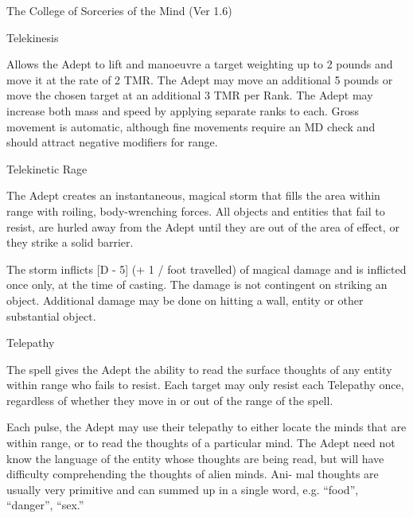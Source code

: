\begin{Chapter}{The College of Sorceries of the Mind (Ver 1.6)}
\begin{spell}[S-7]{Telekinesis }
\begin{effects}
Allows the Adept to lift and manoeuvre a target weighting up to 2
pounds and move it at the rate of 2 TMR. The Adept may move an
additional 5 pounds or move the chosen target at an additional 3 TMR
per Rank.  The Adept may increase both mass and speed by applying
separate ranks to each.  Gross movement is automatic, although fine
movements require an MD check and should attract negative modifiers
for range.
\end{effects}
\end{spell}

\begin{spell}[S-8]{Telekinetic Rage }

\begin{effects}
The Adept creates an instantaneous, magical storm that fills the area
within range with roiling, body-wrenching forces.  All objects and
entities that fail to resist, are hurled away from the Adept until
they are out of the area of effect, or they strike a solid barrier.

The storm inflicts [D - 5] (+ 1 / foot travelled) of magical damage
and is inflicted once only, at the time of casting.  The damage is not
contingent on striking an object. Additional damage may be done on
hitting a wall, entity or other substantial object.
\end{effects}
\end{spell}

\begin{spell}[S-9]{Telepathy }

\begin{effects}
The spell gives the Adept the ability to read the surface thoughts of
any entity within range who fails to resist. Each target may only
resist each Telepathy once, regardless of whether they move in or out
of the range of the spell.

Each pulse, the Adept may use their telepathy to either locate the
minds that are within range, or to read the thoughts of a particular
mind.  The Adept need not know the language of the entity whose
thoughts are being read, but will have difficulty comprehending the
thoughts of alien minds.  Ani- mal thoughts are usually very primitive
and can summed up in a single word, e.g. “food”, “danger”, “sex.”


\end{effects}
\end{spell}
\end{Chapter}
